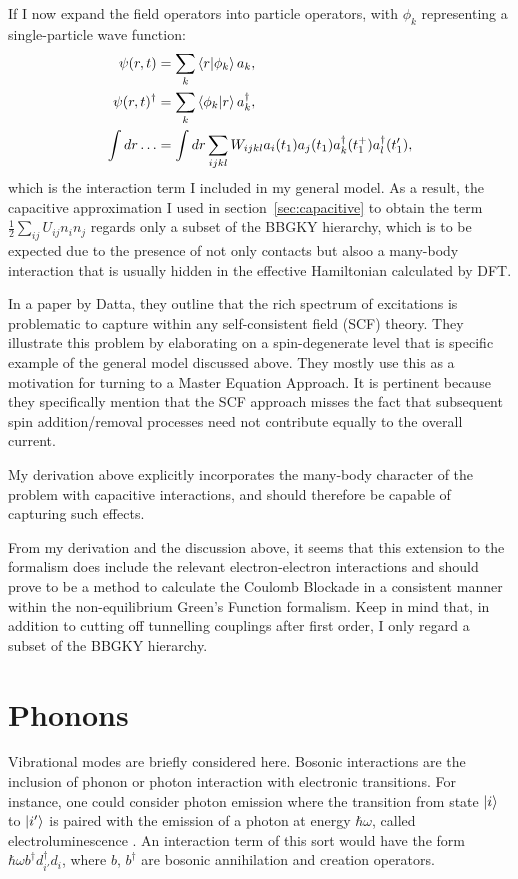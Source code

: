 If I now expand the field operators into particle operators, with $\phi_k$ representing a single-particle wave function:
\begin{align*}
\psi(r, t) &= \sum_k \braket{r|\phi_k} a_k,\\
\psi(r, t)^\dagger &= \sum_k \braket{\phi_k|r} a_k^\dagger,\\
\int dr\ldots &= \int dr \sum_{ijkl} W_{ijkl} a_i(t_1) a_j (t_1) a_k^\dagger(t_1^+) a_l^\dagger(t_1^\prime),
\end{align*} which is the interaction term I included in my general model. As a result, the capacitive approximation I used in section~\ref{sec:capacitive} to obtain the term $\frac{1}{2} \sum_{ij} U_{ij} n_i n_j$ regards only a subset of the BBGKY hierarchy, which is to be expected due to the presence of not only contacts but alsoo a many-body interaction that is usually hidden in the effective Hamiltonian calculated by DFT.

In a paper by Datta\cite{mura}, they outline that the rich spectrum of excitations is problematic to capture within any self-consistent field (SCF) theory. They illustrate this problem by elaborating on a spin-degenerate level that is specific example of the general model discussed above. They mostly use this as a motivation for turning to a Master Equation Approach.  It is pertinent because they specifically mention that the SCF approach misses the fact that subsequent spin addition/removal processes need not contribute equally to the overall current.

My derivation above explicitly incorporates the many-body character of the problem with capacitive interactions, and should therefore be capable of capturing such effects.

From my derivation and the discussion above, it seems that this extension to the formalism does include the relevant electron-electron interactions and should prove to be a method to calculate the Coulomb Blockade in a consistent manner within the non-equilibrium Green's Function formalism. Keep in mind that, in addition to cutting off tunnelling couplings after first order, I only regard a subset of the BBGKY hierarchy.



\section{Phonons}
\label{sec:phononic}

Vibrational modes are briefly considered here. Bosonic interactions are the inclusion of phonon or photon interaction with electronic transitions. For instance, one could consider photon emission where the transition from state $\ket{i}$ to $\ket{i'}$ is paired with the emission of a photon at energy $\hbar \omega$, called electroluminescence \cite{electroluminescence}. An interaction term of this sort would have the form $\hbar\omega b^\dagger d_{i'}^\dagger d_i$, where $b$, $b^\dagger$ are bosonic annihilation and creation operators.

